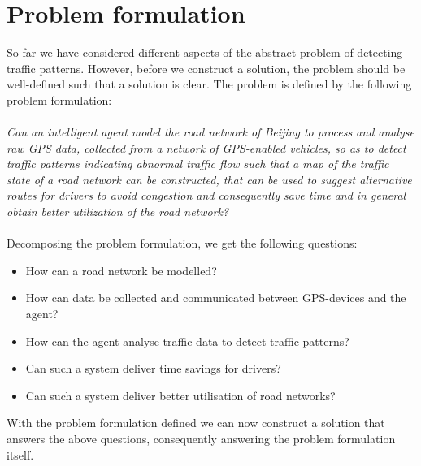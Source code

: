 \section{Problem formulation}
So far we have considered different aspects of the abstract problem of detecting traffic patterns. However, before we construct a solution, the problem should be well-defined such that a solution is clear. The problem is defined by the following problem formulation:
\\\\
\emph{Can an intelligent agent model the road network of Beijing to process and analyse raw GPS data, collected from a network of GPS-enabled vehicles, so as to detect traffic patterns indicating abnormal traffic flow such that a map of the traffic state of a road network can be constructed, that can be used to suggest alternative routes for drivers to avoid congestion and consequently save time and in general obtain better utilization of the road network?}
\\\\
Decomposing the problem formulation, we get the following questions:

\begin{itemize}
\item How can a road network be modelled?
\item How can data be collected and communicated between GPS-devices and the agent?
\item How can the agent analyse traffic data to detect traffic patterns?
\item Can such a system deliver time savings for drivers?
\item Can such a system deliver better utilisation of road networks?
\end{itemize}

With the problem formulation defined we can now construct a solution that answers the above questions, consequently answering the problem formulation itself.


% 